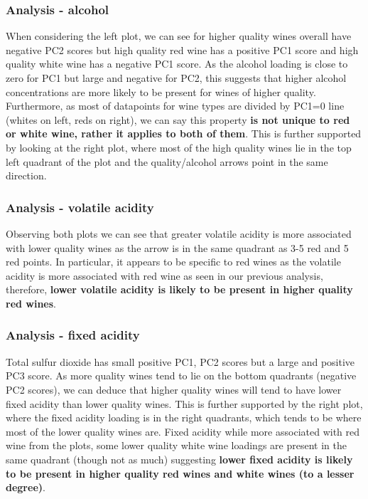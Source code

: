 \documentclass[
]{article}
\begin{document}
\subsubsection{Analysis - alcohol}\label{analysis---alcohol}

When considering the left plot, we can see for higher quality wines
overall have negative PC2 scores but high quality red wine has a
positive PC1 score and high quality white wine has a negative PC1 score.
As the alcohol loading is close to zero for PC1 but large and negative
for PC2, this suggests that higher alcohol concentrations are more
likely to be present for wines of higher quality. Furthermore, as most
of datapoints for wine types are divided by PC1=0 line (whites on left,
reds on right), we can say this property \textbf{is not unique to red or
white wine, rather it applies to both of them}. This is further
supported by looking at the right plot, where most of the high quality
wines lie in the top left quadrant of the plot and the quality/alcohol
arrows point in the same direction.

\subsubsection{Analysis - volatile
acidity}\label{analysis---volatile-acidity}

Observing both plots we can see that greater volatile acidity is more
associated with lower quality wines as the arrow is in the same quadrant
as 3-5 red and 5 red points. In particular, it appears to be specific to
red wines as the volatile acidity is more associated with red wine as
seen in our previous analysis, therefore, \textbf{lower volatile acidity
is likely to be present in higher quality red wines}.

\subsubsection{Analysis - fixed acidity}\label{analysis---fixed-acidity}

Total sulfur dioxide has small positive PC1, PC2 scores but a large and
positive PC3 score. As more quality wines tend to lie on the bottom
quadrants (negative PC2 scores), we can deduce that higher quality wines
will tend to have lower fixed acidity than lower quality wines. This is
further supported by the right plot, where the fixed acidity loading is
in the right quadrants, which tends to be where most of the lower
quality wines are. Fixed acidity while more associated with red wine
from the plots, some lower quality white wine loadings are present in
the same quadrant (though not as much) suggesting \textbf{lower fixed
acidity is likely to be present in higher quality red wines and white
wines (to a lesser degree)}.
\end{document}
